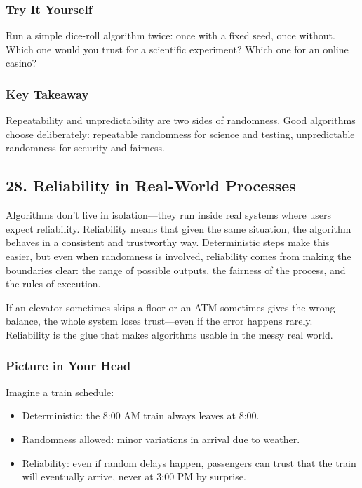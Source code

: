 \documentclass[
  letterpaper,
  DIV=11,
  numbers=noendperiod]{scrreprt}
\providecommand{\tightlist}{%
  \setlength{\itemsep}{0pt}\setlength{\parskip}{0pt}}
\begin{document}
\subsubsection{Try It Yourself}\label{try-it-yourself-26}

Run a simple dice-roll algorithm twice: once with a fixed seed, once
without. Which one would you trust for a scientific experiment? Which
one for an online casino?

\subsubsection{Key Takeaway}\label{key-takeaway-25}

Repeatability and unpredictability are two sides of randomness. Good
algorithms choose deliberately: repeatable randomness for science and
testing, unpredictable randomness for security and fairness.

\subsection{28. Reliability in Real-World
Processes}\label{reliability-in-real-world-processes}

Algorithms don't live in isolation---they run inside real systems where
users expect reliability. Reliability means that given the same
situation, the algorithm behaves in a consistent and trustworthy way.
Deterministic steps make this easier, but even when randomness is
involved, reliability comes from making the boundaries clear: the range
of possible outputs, the fairness of the process, and the rules of
execution.

If an elevator sometimes skips a floor or an ATM sometimes gives the
wrong balance, the whole system loses trust---even if the error happens
rarely. Reliability is the glue that makes algorithms usable in the
messy real world.

\subsubsection{Picture in Your Head}\label{picture-in-your-head-27}

Imagine a train schedule:

\begin{itemize}
\tightlist
\item
  Deterministic: the 8:00 AM train always leaves at 8:00.
\item
  Randomness allowed: minor variations in arrival due to weather.
\item
  Reliability: even if random delays happen, passengers can trust that
  the train will eventually arrive, never at 3:00 PM by surprise.
\end{itemize}
\end{document}
